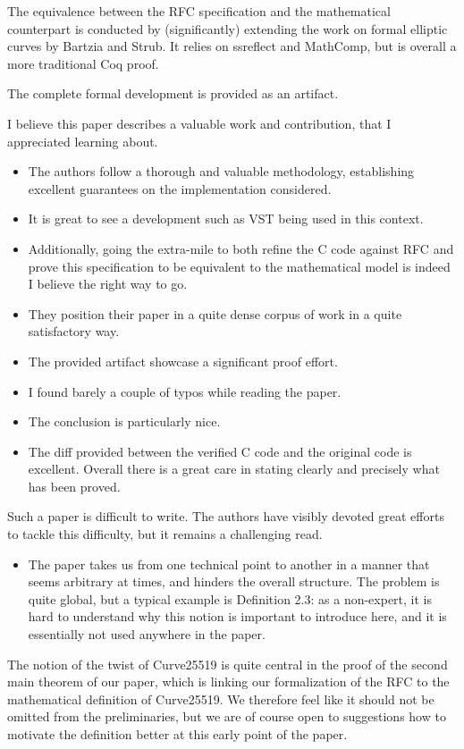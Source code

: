 The equivalence between the RFC specification and the mathematical counterpart
is conducted by (significantly) extending the work on formal elliptic curves by
Bartzia and Strub. It relies on ssreflect and MathComp, but is overall a more
traditional Coq proof.

The complete formal development is provided as an artifact.

\begin{center}
\end{center}
I believe this paper describes a valuable work and contribution, that I appreciated learning about.
\begin{itemize}
  \item The authors follow a thorough and valuable methodology, establishing excellent guarantees on the implementation considered.
  \item It is great to see a development such as VST being used in this context.
  \item Additionally, going the extra-mile to both refine the C code against RFC and prove this specification to be equivalent to the mathematical model is indeed I believe the right way to go.
  \item They position their paper in a quite dense corpus of work in a quite satisfactory way.
  \item The provided artifact showcase a significant proof effort.
  \item I found barely a couple of typos while reading the paper.
  \item The conclusion is particularly nice.
  \item The diff provided between the verified C code and the original code is excellent. Overall there is a great care in stating clearly and precisely what has been proved.
\end{itemize}

\begin{center}
\end{center}

Such a paper is difficult to write. The authors have visibly devoted great efforts to tackle this difficulty, but it remains a challenging read.
\begin{itemize}
  \item The paper takes us from one technical point to another in a manner that seems arbitrary at times, and hinders the overall structure. The problem is quite global, but a typical example is Definition 2.3: as a non-expert, it is hard to understand why this notion is important to introduce here, and it is essentially not used anywhere in the paper.
\end{itemize}
\begin{answer}
  The notion of the twist of Curve25519 is quite central in the proof of the second main theorem of our paper,
  which is linking our formalization of the RFC to the mathematical definition of Curve25519. 
  We therefore feel like it should not be omitted from the preliminaries, but we are of course
  open to suggestions how to motivate the definition better at this early point of the paper.
\end{answer}

